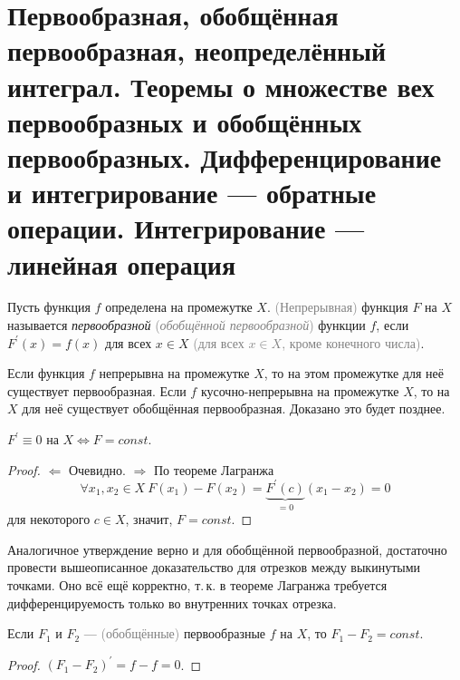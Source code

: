 \section{Первообразная, обобщённая первообразная, неопределённый интеграл. Теоремы о множестве вех первообразных и обобщённых первообразных. Дифференцирование и интегрирование --- обратные операции. Интегрирование --- линейная операция}

\begin{definition}
    Пусть функция $f$ определена на промежутке $X$. \textcolor{gray}{(Непрерывная)} функция $F$ на $X$ называется \textit{первообразной} \textcolor{gray}{(\textit{обобщённой первообразной})} функции $f$, если $F^\prime(x) = f(x)$ для всех $x \in X$ \textcolor{gray}{(для всех $x \in X$, кроме конечного числа)}.
\end{definition}

\begin{remark}
    Если функция $f$ непрерывна на промежутке $X$, то на этом промежутке для неё существует первообразная. Если $f$ кусочно-непрерывна на промежутке $X$, то на $X$ для неё существует обобщённая первообразная. Доказано это будет позднее.
\end{remark}

\begin{statement}
    $F^\prime \equiv 0$ на $X \iff F = const$.
\end{statement}

\begin{proof}
    $\Leftarrow$ Очевидно. $\Rightarrow$ По теореме Лагранжа \[\forall x_1, x_2 \in X\ F(x_1) - F(x_2) = \underbrace{F^\prime(c)}_{{} = 0}(x_1 - x_2) = 0\] для некоторого $c \in X$, значит, $F = const$.
\end{proof}

Аналогичное утверждение верно и для обобщённой первообразной, достаточно провести вышеописанное доказательство для отрезков между выкинутыми точками. Оно всё ещё корректно, т.\,к. в теореме Лагранжа требуется дифференцируемость только во внутренних точках отрезка.

\begin{theorem}
    Если $F_1$ и $F_2$ --- \textcolor{gray}{(обобщённые)} первообразные $f$ на $X$, то $F_1 - F_2 = const$.
\end{theorem}

\begin{proof}
    $(F_1 - F_2)^\prime = f - f = 0$.
\end{proof}

